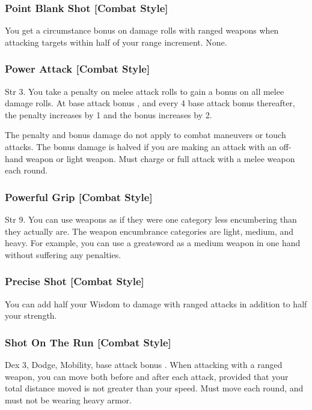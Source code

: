 \subsubsection{Point Blank Shot [Combat Style]}
 You get a  circumstance bonus on damage rolls with ranged weapons when attacking targets within half of your range increment. \babscalingdescription
{} None.

\subsubsection{Power Attack [Combat Style]}
 Str 3.
 You take a  penalty on melee attack rolls to gain a  bonus on all melee damage rolls. At base attack bonus , and every 4 base attack bonus thereafter, the penalty increases by 1 and the bonus increases by 2.
\par The penalty and bonus damage do not apply to combat maneuvers or touch attacks. The bonus damage is halved if you are making an attack with an off-hand weapon or light weapon.
 Must charge or full attack with a melee weapon each round.

\subsubsection{Powerful Grip [Combat Style]}
 Str 9.
 You can use weapons as if they were one category less encumbering than they actually are. The weapon encumbrance categories are light, medium, and heavy. For example, you can use a greatsword as a medium weapon in one hand without suffering any penalties.

\subsubsection{Precise Shot [Combat Style]}
 You can add half your Wisdom to damage with ranged attacks in addition to half your strength.

\subsubsection{Shot On The Run [Combat Style]}
 Dex 3, Dodge, Mobility, base attack bonus .
 When attacking with a ranged weapon, you can move both before and after each attack, provided that your total distance moved is not greater than your speed.
 Must move each round, and must not be wearing heavy armor.

